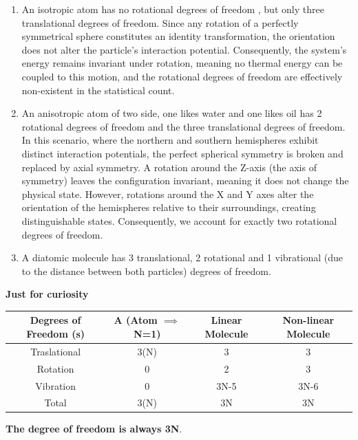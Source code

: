 \documentclass[12pt,a4paper]{report}
\newcommand{\esp}{\vspace{0.5cm}}
\begin{document}
	
	\begin{enumerate}
		\item An isotropic atom has no rotational degrees of freedom , but only three translational degrees of freedom. Since any rotation of a perfectly symmetrical sphere constitutes an identity transformation, the orientation does not alter the particle's interaction potential. Consequently, the system’s energy remains invariant under rotation, meaning no thermal energy can be coupled to this motion, and the rotational degrees of freedom are effectively non-existent in the statistical count.
		\item An anisotropic atom of two side, one likes water and one likes oil has 2 rotational degrees of freedom and the three translational degrees of freedom. In this scenario, where the northern and southern hemispheres exhibit distinct interaction potentials, the perfect spherical symmetry is broken and replaced by axial symmetry. A rotation around the Z-axis (the axis of symmetry) leaves the configuration invariant, meaning it does not change the physical state. However, rotations around the X and Y axes alter the orientation of the hemispheres relative to their surroundings, creating distinguishable states. Consequently, we account for exactly two rotational degrees of freedom.
		\item A diatomic molecule has 3 translational,
		2 rotational and 1 vibrational (due to the distance between both particles) degrees of freedom.
	\end{enumerate}
	
	\esp
	
	\noindent \textbf{Just for curiosity}
	
	\esp
	
	\begin{tabular}{|c|c|c|c|}
		\hline
		Degrees of Freedom (s) & A (Atom $\implies$ N=1) & Linear Molecule & Non-linear Molecule \\
		\hline
		Traslational & 3(N) & 3 & 3 \\
		\hline
		Rotation & 0 & 2 & 3 \\
		\hline
		Vibration & 0 & 3N-5 & 3N-6 \\
		\hline
		Total & 3(N) & 3N & 3N \\
		\hline
	\end{tabular}
	
	\esp
	
	\noindent \textbf{The degree of freedom is always 3N}.
	
	\esp
	
\end{document}
